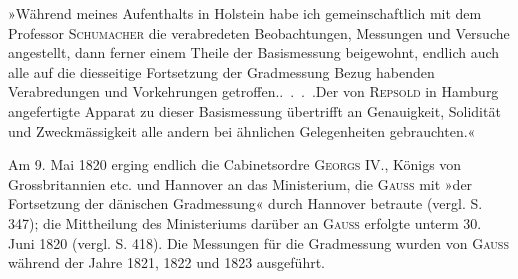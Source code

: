 \par\noindent\hspace*{\parindent}»Während meines Aufenthalts in Holstein habe ich gemeinschaftlich mit dem Professor \textsc{Schumacher} die verabredeten Beobachtungen, Messungen und Versuche angestellt, dann ferner einem Theile der Basismessung beigewohnt, endlich auch alle auf die diesseitige Fortsetzung der Gradmessung Bezug habenden Verabredungen und Vorkehrungen getroffen.\enspace .\ .\ .\ .\enspace Der von \textsc{Repsold} in Hamburg angefertigte Apparat zu dieser Basismessung übertrifft an Genauigkeit, Solidität und Zweckmässigkeit alle andern bei ähnlichen Gelegenheiten gebrauchten.«

\par\noindent\hspace*{\parindent}Am 9. Mai 1820 erging endlich die Cabinetsordre \textsc{Georgs} IV., Königs von Grossbritannien etc. und Hannover an das Ministerium, die \textsc{Gauss} mit »der Fortsetzung der dänischen Gradmessung« durch Hannover betraute (vergl. S. 347); die Mittheilung des Ministeriums darüber an \textsc{Gauss} erfolgte unterm 30. Juni 1820 (vergl. S. 418). Die Messungen für die Gradmessung wurden von \textsc{Gauss} während der Jahre 1821, 1822 und 1823 ausgeführt.

